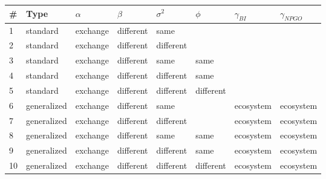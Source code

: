 \begin{tabular}{llllllll}
  \hline
\# & Type & $\alpha$ & $\beta$ & $\sigma^2$ & $\phi$ & $\gamma_{BI}$ & $\gamma_{NPGO}$ \\ 
  \hline
  1 & standard & exchange & different & same &  &  &  \\ 
    2 & standard & exchange & different & different &  &  &  \\ 
    3 & standard & exchange & different & same & same &  &  \\ 
    4 & standard & exchange & different & different & same &  &  \\ 
    5 & standard & exchange & different & different & different &  &  \\ 
    6 & generalized & exchange & different & same &  & ecosystem & ecosystem \\ 
    7 & generalized & exchange & different & different &  & ecosystem & ecosystem \\ 
    8 & generalized & exchange & different & same & same & ecosystem & ecosystem \\ 
    9 & generalized & exchange & different & different & same & ecosystem & ecosystem \\ 
   10 & generalized & exchange & different & different & different & ecosystem & ecosystem \\ 
   \hline
\end{tabular}

